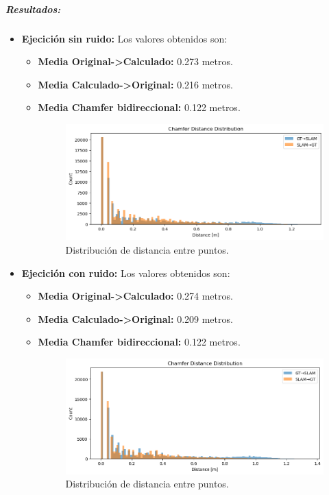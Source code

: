 \documentclass[12pt, a4paper, twoside]{article}
\begin{document}
\subparagraph{Resultados:}
\begin{itemize}
  \item \textbf{Ejecición sin ruido:} Los valores obtenidos son:
  \begin{itemize}
    \item \textbf{Media Original->Calculado:} 0.273 metros.
    \item \textbf{Media Calculado->Original:} 0.216 metros.
    \item \textbf{Media Chamfer\cite{Fan2020Chamfer} bidireccional:} 0.122 metros.
    \begin{figure}[h]
      \centering
        \includegraphics[width=1\textwidth]{chamfer_clean.png}
        \caption{Distribución de distancia entre puntos.}
    \end{figure} 
  \end{itemize}\newpage
  \item \textbf{Ejecición con ruido:} Los valores obtenidos son:
  \begin{itemize}
    \item \textbf{Media Original->Calculado:} 0.274 metros.
    \item \textbf{Media Calculado->Original:} 0.209 metros.
    \item \textbf{Media Chamfer\cite{Fan2020Chamfer} bidireccional:} 0.122 metros.
    \begin{figure}[h]
      \centering
        \includegraphics[width=1\textwidth]{chamfer_noisy.png}
      \caption{Distribución de distancia entre puntos.}
    \end{figure} 
  \end{itemize}
\end{itemize}
\end{document}
